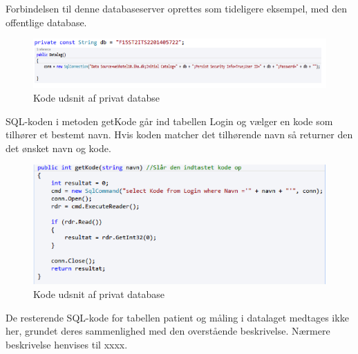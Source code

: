Forbindelsen til denne databaseserver oprettes som tideligere eksempel, med den offentlige database.  

\begin{figure}[H]
	\centering
	\includegraphics[width=1\textwidth]{Figurer/Snip20150525_35}
	\caption{Kode udsnit af privat databse}	
\end{figure}

SQL-koden i metoden getKode går ind tabellen Login og vælger en kode som tilhører et bestemt navn. Hvis koden matcher det tilhørende navn så returner den det ønsket navn og kode.   

\begin{figure}[H]
	\centering
	\includegraphics[width=1\textwidth]{Figurer/Snip20150525_36}
	\caption{Kode udsnit af privat database}
\end{figure}

De resterende SQL-kode for tabellen patient og måling i datalaget medtages ikke her, grundet deres sammenlighed med den overstående beskrivelse. Nærmere beskrivelse henvises til xxxx. 









